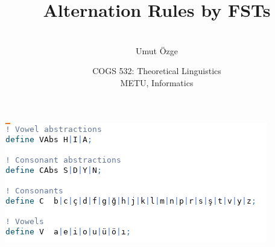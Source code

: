 \documentclass[ignorenonframetext,10pt,aspectratio=169]{beamer}
\title{Alternation Rules by FSTs}
\author{\  \\ \vspace{20pt} Umut \"Ozge\\  }
\date{COGS 532: Theoretical Linguistics\\ METU, Informatics}
\begin{document}
\begin{frame}\frametitle{}
\thispagestyle{empty}
\maketitle
\end{frame}

\begin{frame}[t,plain]
\end{frame}

\begin{frame}[t,plain]
\includegraphics[scale=0.4]{img/img1.png}
\end{frame}
\end{document}
